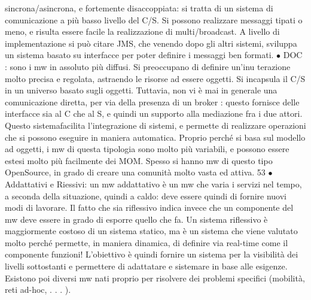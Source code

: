 sincrona/asincrona, e fortemente disaccoppiata: si tratta di un sistema di
comunicazione a più basso livello del C/S. Si possono realizzare messaggi
tipati o meno, e risulta essere facile la realizzazione di multi/broadcast.
A livello di implementazione si può citare JMS, che venendo dopo gli
altri sistemi, sviluppa un sistema basato su interfacce per poter definire i
messaggi ben formati.
$\bullet$ DOC : sono i mw in assoluto più diffusi. Si preoccupano di definire un'inu
terazione molto precisa e regolata, astraendo le risorse ad essere oggetti.
Si incapsula il C/S in un universo basato sugli oggetti. Tuttavia, non vi
è mai in generale una comunicazione diretta, per via della presenza di un
broker : questo fornisce delle interfacce sia al C che al S, e quindi un supporto alla mediazione fra i due attori.
Questo sistemafacilita l'integrazione
di sistemi, e permette di realizzare operazioni che si possono eseguire in
maniera automatica.
Proprio perché si basa sul modello ad oggetti, i mw di questa tipologia
sono molto più variabili, e possono essere estesi molto più facilmente dei
MOM. Spesso si hanno mw di questo tipo OpenSource, in grado di creare
una comunità molto vasta ed attiva.
53
$\bullet$ Addattativi e Riessivi: un mw addattativo è un mw che varia i servizi
nel tempo, a seconda della situazione, quindi a caldo: deve essere quindi
di fornire nuovi modi di lavorare.
Il fatto che sia riflessivo indica invece che un componente del mw deve essere in grado di esporre quello che fa. Un
sistema riflessivo è maggiormente
costoso di un sistema statico, ma è un sistema che viene valutato molto
perché permette, in maniera dinamica, di definire via real-time come il
componente funzioni!
L'obiettivo è quindi fornire un sistema per la visibilità dei livelli sottostanti
e permettere di adattatare e sistemare in base alle esigenze.
Esistono poi diversi mw nati proprio per risolvere dei problemi specifici (mobilità, reti ad-hoc, . . . ).
